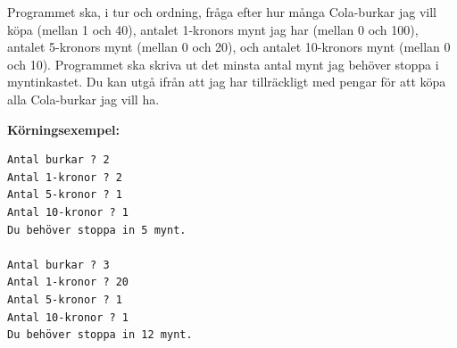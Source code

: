 \documentclass[a4paper,12pt]{article}
\begin{document}
Programmet ska, i tur och ordning, fråga efter hur många Cola-burkar jag vill köpa (mellan 1 och 40), antalet 1-kronors mynt jag har (mellan 0 och 100), antalet 5-kronors mynt (mellan 0 och 20), och antalet 10-kronors mynt (mellan 0 och 10). Programmet ska skriva ut det minsta antal mynt jag behöver stoppa i myntinkastet. Du kan utgå ifrån att jag har tillräckligt med pengar för att köpa alla Cola-burkar jag vill ha.


\textbf{Körningsexempel:}
\begin{lstlisting}
Antal burkar ? 2
Antal 1-kronor ? 2
Antal 5-kronor ? 1
Antal 10-kronor ? 1
Du behöver stoppa in 5 mynt.

Antal burkar ? 3
Antal 1-kronor ? 20
Antal 5-kronor ? 1
Antal 10-kronor ? 1
Du behöver stoppa in 12 mynt.
\end{lstlisting}

\end{document}
